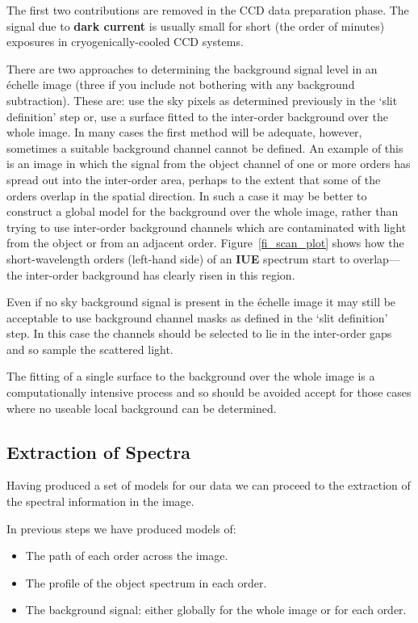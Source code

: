 \documentclass[twoside,11pt]{article}
\newcommand{\htmlref}[2]{#1}
\newcommand{\xlabel}[1]{}
\newcommand{\sgspec}[2]{#1}
\newcommand{\sgspec}[2]{#2}
\begin{document}
The first two contributions are removed in the CCD data preparation
phase.  The signal due to \htmlref{{\bf dark current}}{gl_dark_current} is
usually small for short (the order of minutes) exposures in
cryogenically-cooled CCD systems.

There are two approaches to determining the background signal level in
an \'{e}chelle image (three if you include not bothering with any
background subtraction).  These are: use the sky pixels as determined
previously in the `slit definition' step or, use a surface fitted to the
inter-order background over the whole image.  In many cases the first
method will be adequate, however, sometimes a suitable background channel
cannot be defined.
An example of this is an image in which the signal from the
object channel of one or more orders has spread out into the inter-order
area, perhaps to the extent that some of the orders overlap in the
spatial direction.
In such a case it may be better to construct a global model for the
background over the whole image, rather than trying to use inter-order
background channels which are contaminated with light from the object or
from an adjacent order.  \sgspec{Figure~\ref{fi_scan_plot}}
{\htmlref{The figure}{fi_scan_plot}} shows how the
short-wavelength orders (left-hand side) of an \htmlref{{\bf IUE}}{gl_iue}
spectrum start to overlap\sgspec{---}{ - }the inter-order background has
clearly risen in this region.

Even if no sky background signal is present in the \'{e}chelle image it
may still be acceptable to use background channel masks as defined in
the `slit definition' step.  In this case the channels should be
selected to lie in the inter-order gaps and so sample the scattered
light.

The fitting of a single surface to the background over the whole image
is a computationally intensive process and so should be avoided accept
for those cases where no useable local background can be determined.


\subsection{\label{se_extraction}\xlabel{extraction}Extraction of Spectra}

Having produced a set of models for our data we can proceed to the
extraction of the spectral information in the image.

In previous steps we have produced models of:

\begin{itemize}

\item The path of each order across the image.

\item The profile of the object spectrum in each order.

\item The background signal: either globally for the whole image or
      for each order.

\end{itemize}
\end{document}
